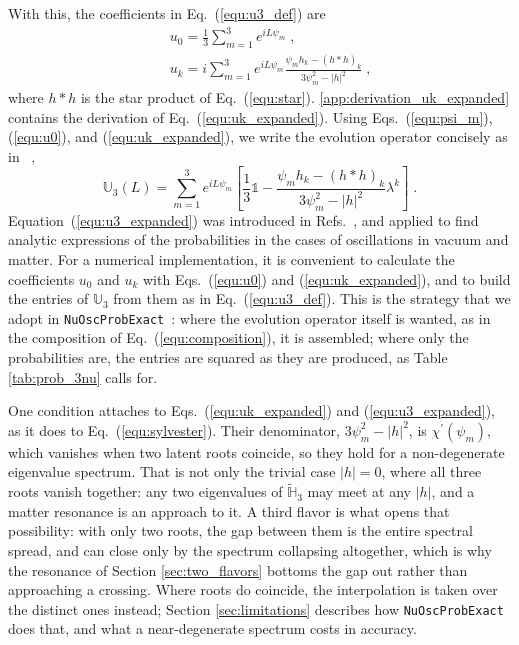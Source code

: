\documentclass[final,5p,times,twocolumn,sort,compress]{elsarticle}
\newcommand{\eq}{Eq.}
\providecommand{\Ref}{}
\newcommand{\Refs}{Refs.}
\newcommand{\equ}[1]{\eq~(\ref{equ:#1})}
\begin{document}
With this, the coefficients in \equ{u3_def} are
\begin{eqnarray}
 && \label{equ:u0}
 u_0=\frac{1}{3}\sum_{m=1}^3 e^{i L \psi_m} \;, \\
 \label{equ:uk_expanded}
 && u_k
 =
 i\sum_{m=1}^3
 e^{i L \psi_m} \frac{\psi_m h_k - \left(h \ast h\right)_k}{3\psi_m^2 - \left\vert h \right\vert^2} \;,
\end{eqnarray}
where $h \ast h$ is the star product of \equ{star}.  \ref{app:derivation_uk_expanded} contains the derivation of \equ{uk_expanded}.  Using Eqs.\ (\ref{equ:psi_m}), (\ref{equ:u0}), and (\ref{equ:uk_expanded}), we write the evolution operator concisely as in \Ref\ \cite{Ohlsson:1999xb},
\begin{equation}
 \label{equ:u3_expanded}
 \mathbb{U}_3(L)
 =
 \sum_{m=1}^3
 e^{i L \psi_m}
 \left[
 \frac{1}{3} \mathbb{1}
 -
 \frac{\psi_m h_k - \left( h \ast h \right)_k}{3\psi_m^2-\lvert h \rvert^2} \lambda^k
 \right] \;.
\end{equation}
Equation~(\ref{equ:u3_expanded}) was introduced in \Refs\ \cite{Ohlsson:1999xb, Ohlsson:1999um, Ohlsson:2000zz}, and applied to find analytic expressions of the probabilities in the cases of oscillations in vacuum and matter.  For a numerical implementation, it is convenient to calculate the coefficients $u_0$ and $u_k$ with Eqs.\ (\ref{equ:u0}) and (\ref{equ:uk_expanded}), and to build the entries of $\mathbb{U}_3$ from them as in \equ{u3_def}.  This is the strategy that we adopt in {\tt NuOscProbExact}\ \cite{NuOscProbExact}: where the evolution operator itself is wanted, as in the composition of \equ{composition}, it is assembled; where only the probabilities are, the entries are squared as they are produced, as Table \ref{tab:prob_3nu} calls for.

One condition attaches to Eqs.~(\ref{equ:uk_expanded}) and (\ref{equ:u3_expanded}), as it does to \equ{sylvester}.  Their denominator, $3\psi_m^2 - \lvert h \rvert^2$, is $\chi^\prime(\psi_m)$, which vanishes when two latent roots coincide, so they hold for a non-degenerate eigenvalue spectrum.  That is not only the trivial case $\lvert h \rvert = 0$, where all three roots vanish together: any two eigenvalues of $\tilde{\mathbb{H}}_3$ may meet at any $\lvert h \rvert$, and a matter resonance is an approach to it.  A third flavor is what opens that possibility: with only two roots, the gap between them is the entire spectral spread, and can close only by the spectrum collapsing altogether, which is why the resonance of Section \ref{sec:two_flavors} bottoms the gap out rather than approaching a crossing.  Where roots do coincide, the interpolation is taken over the distinct ones instead; Section \ref{sec:limitations} describes how {\tt NuOscProbExact} does that, and what a near-degenerate spectrum costs in accuracy.
\end{document}
